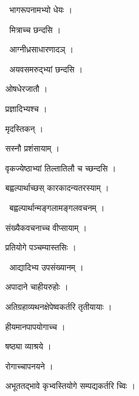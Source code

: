 \documentclass[10pt, openany, oneside]{book}
\begin{document}
\par\noindent\hspace{1.5em}{\vps वा॰}~{\qt भागरूपनामभ्यो धेयः ।}

\par\noindent\hspace{1.5em}{\vps वा॰}~{\qt मित्राच्च छन्दसि ।}

\par\noindent\hspace{1.5em}{\vps वा॰}~{\qt आग्नीध्रसाधारणादञ् ।}

\par\noindent\hspace{1.5em}{\vps वा॰}~{\qt अयवसमरुद्भ्यां छन्दसि ।}

\noindent ओषधेरजातौ ।

\noindent प्रज्ञादिभ्यश्च ।

\noindent मृदस्तिकन् ।

\noindent सस्नौ प्रशंसायाम् ।

\noindent वृकज्येष्ठाभ्यां तिल्तातिलौ च च्छन्दसि ।

\noindent बह्वल्पार्थाच्छस् कारकादन्यतरस्याम् ।

\par\noindent\hspace{1.5em}{\vps वा॰}~{\qt बह्वल्पार्थान्मङ्गलामङ्गलवचनम् ।}

\noindent संख्यैकवचनाच्च वीप्सायाम् ।

\noindent प्रतियोगे पञ्चम्यास्तसिः ।

\par\noindent\hspace{1.5em}{\vps वा॰}~{\qt आद्यादिभ्य उपसंख्यानम् ।}

\noindent अपादाने चाहीयरुहोः ।

\noindent अतिग्रहाव्यथनक्षेपेष्वकर्तरि तृतीयायाः ।

\noindent हीयमानपापयोगाच्च ।

\noindent षष्ठ्या व्याश्रये ।

\noindent रोगाच्चापनयने ।

\noindent अभूततद्भावे कृभ्वस्तियोगे सम्पद्यकर्तरि च्विः ।
\end{document}
